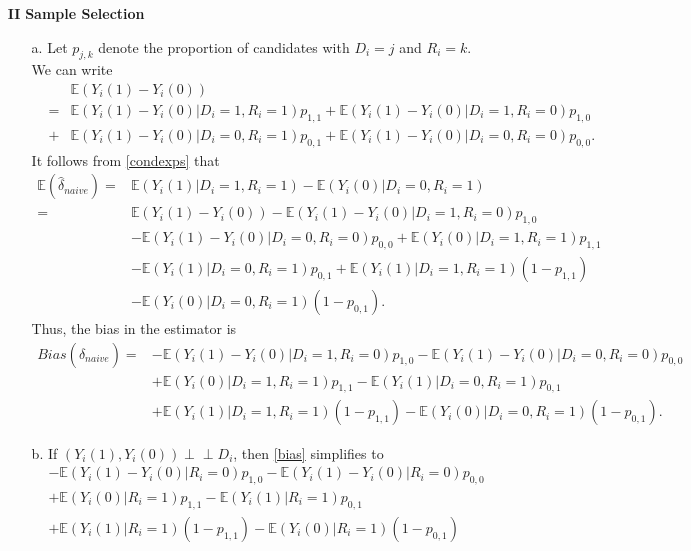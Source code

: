 \documentclass{article}
\def\E{{\mathbb E}}
\newcommand{\indep}{\perp\!\!\!\perp}
\begin{document}
\begin{itemize}
\item[{\large \bf  II}] {\large \bf  Sample Selection}
\begin{itemize}
\item[a.] 	Let $p_{j,k}$ denote the proportion of candidates with $D_i = j$ and $R_i = k$.
	We can write
	\begin{eqnarray}
	&&\E(Y_i(1) - Y_i(0))\nonumber \\
	&=&\E(Y_i(1) - Y_i(0)| D_i = 1, R_i = 1)p_{1,1} +
	   \E(Y_i(1) - Y_i(0)| D_i = 1, R_i = 0)p_{1,0}\nonumber \\
	&+&\E(Y_i(1) - Y_i(0)| D_i = 0, R_i = 1)p_{0,1}+
		 \E(Y_i(1) - Y_i(0)| D_i = 0, R_i = 0)p_{0,0}.
	\label{condexps}
	\end{eqnarray}
	It follows from \eqref{condexps} that
	\begin{align}
		\E(\hat \delta_{naive})  = & \E(Y_i(1)|D_i = 1, R_i = 1) - \E(Y_i(0)|D_i = 0, R_i = 1) 
		\nonumber \\
		= &\E(Y_i(1) - Y_i(0)) -\E(Y_i(1) - Y_i(0)| D_i = 1, R_i = 0)p_{1,0} \nonumber \\
		 &- \E(Y_i(1) - Y_i(0)| D_i = 0, R_i = 0)p_{0,0} + \E(Y_i(0)| D_i = 1, R_i = 1)p_{1,1} 
		 \nonumber \\
		 & - \E(Y_i(1)| D_i = 0, R_i = 1)p_{0,1} + \E(Y_i(1)| D_i = 1, R_i = 1)(1 - p_{1,1}) \nonumber \\
		 & - \E(Y_i(0)|D_i = 0, R_i = 1)(1 - p_{0,1}).
		 \label{ugequal}
	\end{align}
	Thus, the bias in the estimator is
	\begin{align}
		Bias(\hat \delta_{naive}) = &
		 - \E(Y_i(1) - Y_i(0)| D_i = 1, R_i = 0)p_{1,0} -\E(Y_i(1) - Y_i(0)| D_i = 0, R_i = 0)p_{0,0} \nonumber \\
		 & + \E(Y_i(0)| D_i = 1, R_i = 1)p_{1,1}  - \E(Y_i(1)| D_i = 0, R_i = 1)p_{0,1} \nonumber \\
		 & + \E(Y_i(1)| D_i = 1, R_i = 1)(1 - p_{1,1}) - \E(Y_i(0)|D_i = 0, R_i = 1)(1 - p_{0,1}). 
		 \label{bias}
	\end{align}
\item[b.] 
	If $(Y_i(1),Y_i(0)) \indep D_i$, then \eqref{bias} simplifies to
	\begin{align}
		& - \E(Y_i(1) - Y_i(0)| R_i = 0)p_{1,0} - \E(Y_i(1) - Y_i(0)| R_i = 0)p_{0,0} \nonumber \\
		 & + \E(Y_i(0)|  R_i = 1)p_{1,1}  - \E(Y_i(1)|  R_i = 1)p_{0,1} \nonumber \\
		 & + \E(Y_i(1)|  R_i = 1)(1 - p_{1,1}) - \E(Y_i(0)| R_i = 1)(1 - p_{0,1}) \nonumber \\

\end{align}
\end{itemize}
\end{itemize}
\end{document}

